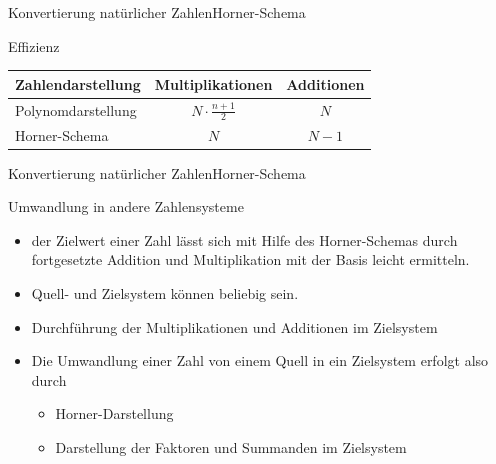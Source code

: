 \documentclass[xelatex,aspectratio=169]{beamer}
\begin{document}
\begin{frame}{Konvertierung natürlicher Zahlen}{Horner-Schema}
  \begin{block}{Effizienz}
    \centering
    \begin{tabular}{lcc}
      \toprule
      \textbf{Zahlendarstellung} & \textbf{Multiplikationen} & \textbf{Additionen} \\
      \midrule
      Polynomdarstellung         & $N \cdot \frac{n+1}{2}$   & $N$                 \\
      Horner-Schema              & $N$                       & $N-1$               \\
      \bottomrule
    \end{tabular}

  \end{block}
\end{frame}

\begin{frame}{Konvertierung natürlicher Zahlen}{Horner-Schema}
  \begin{block}{Umwandlung in andere Zahlensysteme}
    \begin{itemize}
      \item der Zielwert einer Zahl lässt sich mit Hilfe des Horner-Schemas durch fortgesetzte Addition und Multiplikation mit der Basis leicht ermitteln.
      \item Quell- und Zielsystem können beliebig sein.
      \item Durchführung der Multiplikationen und Additionen im Zielsystem
      \item Die Umwandlung einer Zahl von einem Quell in ein Zielsystem erfolgt also durch
            \begin{itemize}
              \item Horner-Darstellung
              \item Darstellung der Faktoren und Summanden im Zielsystem
            \end{itemize}
    \end{itemize}

  \end{block}
\end{frame}
\end{document}

